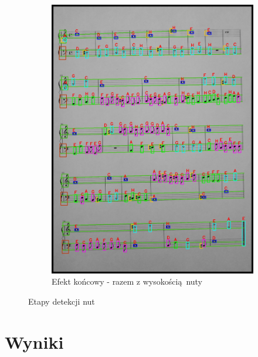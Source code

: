 \documentclass[12pt]{article}
\begin{document}
\begin{figure}[h!]
\begin{subfigure}[b]{0.32\linewidth}
				\includegraphics[width=\linewidth]{zdj/step_6.jpg}
				\caption{Efekt końcowy - razem z wysokością nuty}
			\end{subfigure}
			\label{fig:nuty}
			\caption{Etapy detekcji nut}
		\end{figure}
	
	\section{Wyniki}
	
\end{document}
